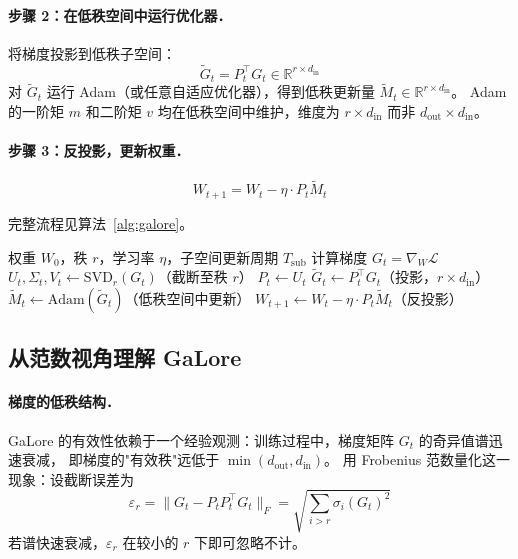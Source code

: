 \documentclass[12pt, a4paper]{article}
\begin{document}
\paragraph{步骤 2：在低秩空间中运行优化器．}
将梯度投影到低秩子空间：
\[
  \tilde{G}_t = P_t^\top G_t \in \mathbb{R}^{r \times d_{\mathrm{in}}}
\]
对 $\tilde{G}_t$ 运行 Adam（或任意自适应优化器），得到低秩更新量 $\tilde{M}_t \in \mathbb{R}^{r \times d_{\mathrm{in}}}$。
Adam 的一阶矩 $m$ 和二阶矩 $v$ 均在低秩空间中维护，维度为 $r \times d_{\mathrm{in}}$ 而非 $d_{\mathrm{out}} \times d_{\mathrm{in}}$。

\paragraph{步骤 3：反投影，更新权重．}
\[
  W_{t+1} = W_t - \eta \cdot P_t \tilde{M}_t
\]

\noindent 完整流程见算法~\ref{alg:galore}。

\begin{algorithm}[t]
\caption{GaLore（单层，简化版）}
\label{alg:galore}
\begin{algorithmic}[1]
\Require 权重 $W_0$，秩 $r$，学习率 $\eta$，子空间更新周期 $T_{\mathrm{sub}}$
  \State 计算梯度 $G_t = \nabla_W \mathcal{L}$
    \State $U_t, \Sigma_t, V_t \leftarrow \mathrm{SVD}_r(G_t)$\quad（截断至秩 $r$）
    \State $P_t \leftarrow U_t$
  \EndIf
  \State $\tilde{G}_t \leftarrow P_t^\top G_t$\quad（投影，$r \times d_{\mathrm{in}}$）
  \State $\tilde{M}_t \leftarrow \mathrm{Adam}(\tilde{G}_t)$\quad（低秩空间中更新）
  \State $W_{t+1} \leftarrow W_t - \eta \cdot P_t \tilde{M}_t$\quad（反投影）
\EndFor
\end{algorithmic}
\end{algorithm}

\subsection{从范数视角理解 GaLore}

\paragraph{梯度的低秩结构．}
GaLore 的有效性依赖于一个经验观测：训练过程中，梯度矩阵 $G_t$ 的奇异值谱迅速衰减，
即梯度的"有效秩"远低于 $\min(d_{\mathrm{out}}, d_{\mathrm{in}})$。
用 Frobenius 范数量化这一现象：设截断误差为
\[
  \varepsilon_r = \|G_t - P_t P_t^\top G_t\|_F
  = \sqrt{\sum_{i > r} \sigma_i(G_t)^2}
\]
若谱快速衰减，$\varepsilon_r$ 在较小的 $r$ 下即可忽略不计。
\end{document}
